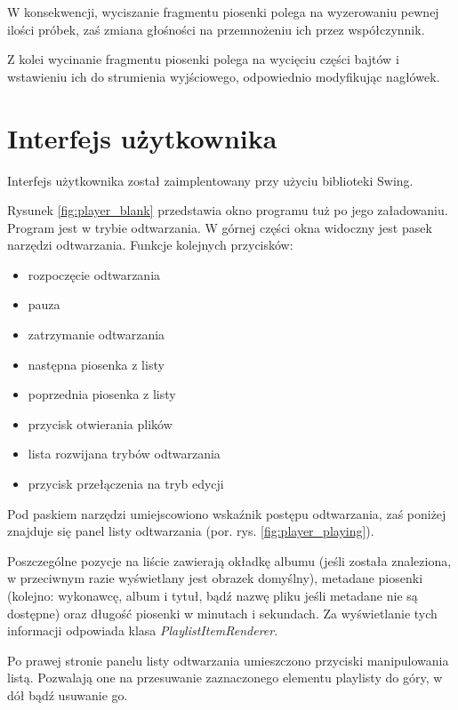 \documentclass[12pt,a4paper,notitlepage]{article}
\begin{document}
W konsekwencji, wyciszanie fragmentu piosenki polega na wyzerowaniu pewnej ilości próbek, zaś zmiana głośności na przemnożeniu ich przez współczynnik. 

Z kolei wycinanie fragmentu piosenki polega na wycięciu części bajtów i wstawieniu ich do strumienia wyjściowego, odpowiednio modyfikując nagłówek.

\section{Interfejs użytkownika}
\label{sec:Interfejs}
Interfejs użytkownika został zaimplentowany przy użyciu biblioteki Swing.

Rysunek \ref{fig:player_blank} przedstawia okno programu tuż po jego załadowaniu. Program jest w trybie odtwarzania. W górnej części okna widoczny jest pasek narzędzi odtwarzania. Funkcje kolejnych
przycisków:
\begin{itemize}
 \item rozpoczęcie odtwarzania
 \item pauza
 \item zatrzymanie odtwarzania
 \item następna piosenka z listy
 \item poprzednia piosenka z listy
 \item przycisk otwierania plików
 \item lista rozwijana trybów odtwarzania
 \item przycisk przełączenia na tryb edycji
\end{itemize}
Pod paskiem narzędzi umiejscowiono wskaźnik postępu odtwarzania, zaś poniżej znajduje się panel listy odtwarzania (por. rys. \ref{fig:player_playing}).

Poszczególne pozycje na liście zawierają okładkę albumu (jeśli została znaleziona, w przeciwnym razie wyświetlany jest obrazek domyślny), metadane piosenki (kolejno: wykonawcę, 
album i tytuł, bądź nazwę pliku jeśli metadane nie są dostępne) oraz długość piosenki w minutach i sekundach. Za wyświetlanie tych informacji odpowiada klasa \emph{PlaylistItemRenderer}.

Po prawej stronie panelu listy odtwarzania umieszczono przyciski manipulowania listą. Pozwalają one na przesuwanie zaznaczonego elementu playlisty do góry, w dół bądź usuwanie go.
\end{document}
